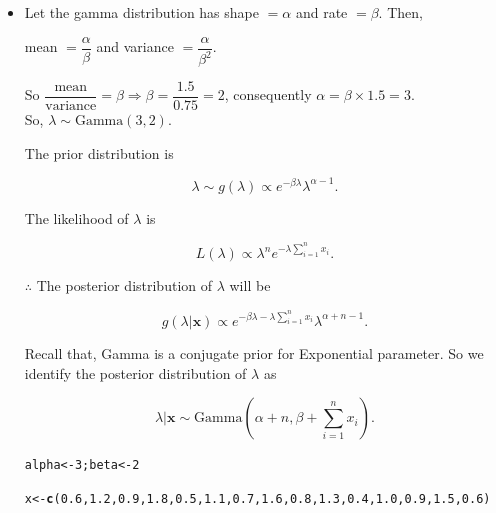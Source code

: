 \documentclass[11pt, a4paper]{article}\usepackage[]{graphicx}\usepackage[]{xcolor}
\makeatletter
\newcommand{\hlnum}[1]{\textcolor[rgb]{0.686,0.059,0.569}{#1}}%
\newcommand{\hldef}[1]{\textcolor[rgb]{0.345,0.345,0.345}{#1}}%
\newcommand{\hlkwb}[1]{\textcolor[rgb]{0.69,0.353,0.396}{#1}}%
\newcommand{\hlkwd}[1]{\textcolor[rgb]{0.737,0.353,0.396}{\textbf{#1}}}%
\newenvironment{kframe}{%
 \def\at@end@of@kframe{}%
 \ifinner\ifhmode%
  \def\at@end@of@kframe{\end{minipage}}%
  \begin{minipage}{\columnwidth}%
 \fi\fi%
 \def\FrameCommand##1{\hskip\@totalleftmargin \hskip-\fboxsep
 \colorbox{shadecolor}{##1}\hskip-\fboxsep
     \hskip-\linewidth \hskip-\@totalleftmargin \hskip\columnwidth}%
 \MakeFramed {\advance\hsize-\width
   \@totalleftmargin\z@ \linewidth\hsize
   \@setminipage}}%
 {\par\unskip\endMakeFramed%
 \at@end@of@kframe}
\newenvironment{knitrout}{}{} %
\makeatother
\begin{document}
\begin{itemize}

\item[\scalebox{2.0}{\twemoji{keycap: 1}}] \hspace{0.1cm} Let the gamma distribution has shape $ = \alpha$ and rate $= \beta$. Then, 

\begin{center}
mean $ = \dfrac{\alpha}{\beta}$ and variance $ = \dfrac{\alpha}{\beta^2}$.
\end{center}

So $\dfrac{\text{mean}}{\text{variance}} = \beta \Rightarrow \beta = \dfrac{1.5}{0.75} = 2$, consequently $\alpha = \beta \times 1.5 = 3$.\\[0.3em]

So, $\lambda \sim \text{Gamma}(3, 2)$.

The prior distribution is 

$$\lambda \sim g(\lambda) \propto e^{-\beta \lambda} {\lambda}^{\alpha - 1}.$$

The likelihood of $\lambda$ is

$$L(\lambda) \propto {\lambda^n} {e^{-\lambda \sum \limits_{i = 1}^{n} x_i}}.$$

\newpage

$\therefore$ The posterior distribution of $\lambda$ will be

$$g(\lambda | \mathbf{x}) \propto e^{-\beta \lambda - \lambda \sum \limits_{i = 1}^{n} x_i} {\lambda}^{\alpha + n - 1}.$$

Recall that, Gamma is a conjugate prior for Exponential parameter. So we identify the posterior distribution of $\lambda$ as

$$\lambda | \mathbf{x} \sim \text{Gamma}\left( \alpha + n, \beta + \sum \limits_{i = 1}^{n} x_i \right).$$

\begin{knitrout}
\color{fgcolor}\begin{kframe}
\begin{alltt}
\hldef{alpha} \hlkwb{<-} \hlnum{3}\hldef{; beta} \hlkwb{<-} \hlnum{2}
\end{alltt}
\end{kframe}
\end{knitrout}

\begin{knitrout}
\color{fgcolor}\begin{kframe}
\begin{alltt}
\hldef{x} \hlkwb{<-} \hlkwd{c}\hldef{(}\hlnum{0.6}\hldef{,} \hlnum{1.2}\hldef{,} \hlnum{0.9}\hldef{,} \hlnum{1.8}\hldef{,} \hlnum{0.5}\hldef{,} \hlnum{1.1}\hldef{,} \hlnum{0.7}\hldef{,} \hlnum{1.6}\hldef{,} \hlnum{0.8}\hldef{,} \hlnum{1.3}\hldef{,} \hlnum{0.4}\hldef{,} \hlnum{1.0}\hldef{,} \hlnum{0.9}\hldef{,} \hlnum{1.5}\hldef{,} \hlnum{0.6}\hldef{)}
\end{alltt}
\end{kframe}
\end{knitrout}


\end{itemize}
\end{document}
